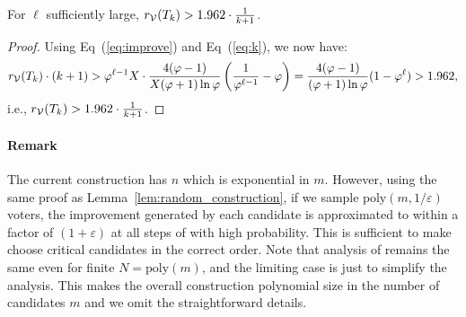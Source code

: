 \begin{lemma}
\label{lem:greedyopt1}
For $\ell$ sufficiently large, $r_{\mathcal{V}}(T_k) > 1.962 \cdot \frac{1}{k + 1}$.
\end{lemma}
\begin{proof}
Using Eq~(\ref{eq:improve}) and Eq~(\ref{eq:k}), we now have:
$$r_{\mathcal{V}}(T_k) \cdot(k + 1) > \varphi^{\ell - 1}X \cdot \frac{4(\varphi - 1)}{X(\varphi + 1)\ln\varphi}\left(\frac{1}{\varphi^{\ell - 1}} - \varphi\right) = \frac{4(\varphi - 1)}{(\varphi + 1)\ln\varphi}(1 - \varphi^{\ell}) > 1.962,$$
i.e., $r_{\mathcal{V}}(T_k) > 1.962 \cdot \frac{1}{k + 1}$.
\end{proof}


\paragraph{Remark} The current construction has $n$ which is exponential in $m$. However, using the same proof as Lemma~\ref{lem:random_construction}, if we sample $\mbox{poly}(m,1/\varepsilon)$ voters, the improvement generated by each candidate is approximated to within a factor of $(1+\varepsilon)$ at all steps of \g{} with high probability. This is sufficient to make \g{}  choose critical candidates in the correct order. Note that analysis of \g{} remains the same even for finite $N = \mbox{poly}(m)$, and the limiting case is just to simplify the analysis. This makes the overall construction polynomial size in the number of candidates $m$ and we omit the straightforward details.


\fi
